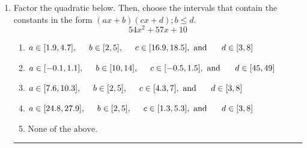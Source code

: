 \documentclass[14pt]{extbook}
\newcommand{\litem}[1]{\item#1\hspace*{-1cm}\rule{\textwidth}{0.4pt}}
\begin{document}
\begin{enumerate}
{\begin{enumerate}[label=\Alph*.]
\end{enumerate} }
\litem{
Factor the quadratic below. Then, choose the intervals that contain the constants in the form $(ax+b)(cx+d); b \leq d.$\[ 54x^{2} +57 x + 10 \]\begin{enumerate}[label=\Alph*.]
\item \( a \in [1.9, 4.7], \hspace*{5mm} b \in [2, 5], \hspace*{5mm} c \in [16.9, 18.5], \text{ and } \hspace*{5mm} d \in [3, 8] \)
\item \( a \in [-0.1, 1.1], \hspace*{5mm} b \in [10, 14], \hspace*{5mm} c \in [-0.5, 1.5], \text{ and } \hspace*{5mm} d \in [45, 49] \)
\item \( a \in [7.6, 10.3], \hspace*{5mm} b \in [2, 5], \hspace*{5mm} c \in [4.3, 7], \text{ and } \hspace*{5mm} d \in [3, 8] \)
\item \( a \in [24.8, 27.9], \hspace*{5mm} b \in [2, 5], \hspace*{5mm} c \in [1.3, 5.3], \text{ and } \hspace*{5mm} d \in [3, 8] \)
\item \( \text{None of the above.} \)


\end{enumerate}}
\end{enumerate}
\end{document}
